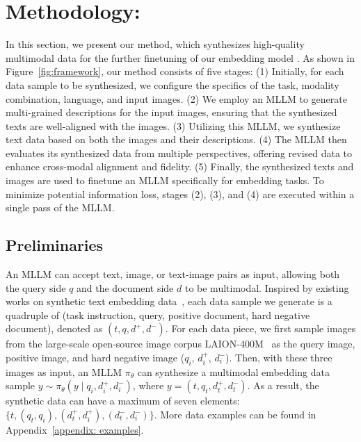 \section{Methodology: \ours{}}

In this section, we present our method, which synthesizes high-quality multimodal data for the further finetuning of our embedding model \ours{}.
As shown in Figure~\ref{fig:framework}, our method consists of five stages: 
(1) Initially, for each data sample to be synthesized, we configure the specifics of the task, modality combination, language, and input images.
(2) We employ an MLLM to generate multi-grained descriptions for the input images, ensuring that the synthesized texts are well-aligned with the images.
(3) Utilizing this MLLM, we synthesize text data based on both the images and their descriptions.
(4) The MLLM then evaluates its synthesized data from multiple perspectives, offering revised data to enhance cross-modal alignment and fidelity.
(5) Finally, the synthesized texts and images are used to finetune an MLLM specifically for embedding tasks.
To minimize potential information loss, stages (2), (3), and (4) are executed within a single pass of the MLLM.

\subsection{Preliminaries}

An MLLM can accept text, image, or text-image pairs as input, allowing both the query side $q$ and the document side $d$ to be multimodal.
Inspired by existing works on synthetic text embedding data~\cite{E5mistral, speed}, each data sample we generate is a quadruple of (task instruction, query, positive document, hard negative document), denoted as $(t, q, d^+, d^-)$.
For each data piece, we first sample images from the large-scale open-source image corpus LAION-400M~\cite{LAION} as the query image, positive image, and hard negative image ($q_i$, $d^+_i$, $d^-_i$).
Then, with these three images as input, an MLLM $\pi_{\theta}$ can synthesize a multimodal embedding data sample $ y \sim \pi_{\theta} (y \mid q_i, d^+_i, d^-_i) $, where $y = (t, q_t, d^+_t, d^-_t)$.
As a result, the synthetic data can have a maximum of seven elements: $\{t, (q_t, q_i), (d^+_t, d^+_i), (d^-_t, d^-_i)\}$.
More data examples can be found in Appendix~\ref{appendix: examples}.

